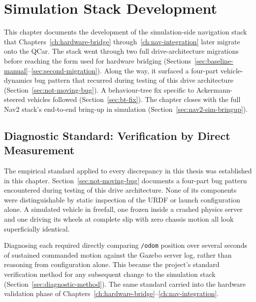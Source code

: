 \chapter{Simulation Stack Development}
\label{ch:sim-stack}


This chapter documents the development of the simulation-side
navigation stack that Chapters~\ref{ch:hardware-bridge}
through~\ref{ch:nav-integration} later migrate onto the
QCar. The stack went through two full drive-architecture migrations before
reaching the form used for hardware bridging
(Sections~\ref{sec:baseline-manual}--\ref{sec:second-migration}).
Along the way, it surfaced a four-part vehicle-dynamics bug pattern
that recurred during testing of this drive architecture
(Section~\ref{sec:not-moving-bug}). A behaviour-tree fix specific to
Ackermann-steered vehicles followed
(Section~\ref{sec:bt-fix}). The chapter closes with the full Nav2 stack's end-to-end bring-up in
simulation (Section~\ref{sec:nav2-sim-bringup}).

\section{Diagnostic Standard: Verification by Direct Measurement}
\label{sec:methodology-overview}

The empirical standard applied to every discrepancy in this thesis
was established in this chapter. Section~\ref{sec:not-moving-bug}
documents a four-part bug pattern encountered during testing of this
drive architecture. None of its components were distinguishable by
static inspection of the URDF or launch configuration alone. A
simulated vehicle in freefall, one frozen inside a crashed physics
server and one driving its wheels at complete slip with zero chassis
motion all look superficially identical.

Diagnosing each required directly comparing \texttt{/odom} position
over several seconds of sustained commanded motion against the
Gazebo server log, rather than reasoning from configuration alone.
This became the project's standard verification method for any
subsequent change to the simulation stack
(Section~\ref{sec:diagnostic-method}). The same standard carried
into the hardware validation phase of
Chapters~\ref{ch:hardware-bridge}--\ref{ch:nav-integration}.

